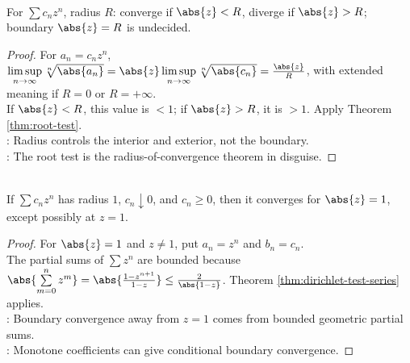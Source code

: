 \begin{theorem} \label{thm:power-series-radius-convergence} \\
For $\sum c_nz^n$, radius $R$: converge if $\abs{z}<R$, diverge if $\abs{z}>R$; boundary $\abs{z}=R$ is undecided.
\begin{proof}
For $a_n=c_nz^n$, $\limsup\limits_{n\to\infty}\sqrt[n]{\abs{a_n}}=\abs{z}\limsup\limits_{n\to\infty}\sqrt[n]{\abs{c_n}}=\frac{\abs{z}}{R}$, with extended meaning if $R=0$ or $R=+\infty$.\\
If $\abs{z}<R$, this value is $<1$; if $\abs{z}>R$, it is $>1$. Apply Theorem \ref{thm:root-test}.\\
: Radius controls the interior and exterior, not the boundary.\\
: The root test is the radius-of-convergence theorem in disguise.
\end{proof}
\end{theorem}

\begin{theorem} \label{thm:power-series-boundary-dirichlet} \\
If $\sum c_nz^n$ has radius $1$, $c_n\downarrow0$, and $c_n\geq0$, then it converges for $\abs{z}=1$, except possibly at $z=1$.
\begin{proof}
For $\abs{z}=1$ and $z\neq1$, put $a_n=z^n$ and $b_n=c_n$.\\
The partial sums of $\sum z^n$ are bounded because $\abs{\sum\limits_{m=0}^{n}z^m}=\abs{\frac{1-z^{n+1}}{1-z}}\leq\frac{2}{\abs{1-z}}$. Theorem \ref{thm:dirichlet-test-series} applies.\\
: Boundary convergence away from $z=1$ comes from bounded geometric partial sums.\\
: Monotone coefficients can give conditional boundary convergence.
\end{proof}
\end{theorem}

